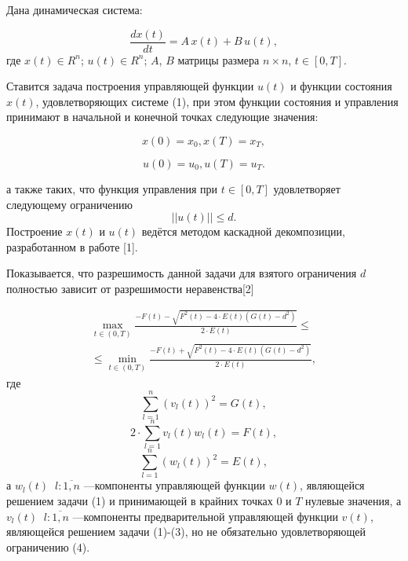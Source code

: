 



Дана  динамическая система:

\begin{equation}
\frac{dx(t)}{dt}=A\, x(t)+B\, u(t),
\end{equation}
где $x(t)\in R^{n}$;
$u(t)\in R^{n}$;
$A$, $B$ матрицы размера $n\times n
$,  $t\in [0,T]$.

Ставится задача построения  управляющей функции $u(t)$ и функции состояния $x(t)$, удовлетворяющих системе (1), при этом  функции состояния и управления  принимают в начальной и конечной точках следующие  значения:

\begin{equation}
x(0)=x_{0},x(T)=x_{T},
\end{equation}

\begin{equation}
u(0)=u_{0},u(T)=u_{T}.
\end{equation}

а также таких, что функция управления при $t\in [0,T]$ удовлетворяет следующему ограничению
\begin{equation}
||u(t)||\leqslant d.
\end{equation}
 Построение $x(t)$ и $u(t)$ ведётся методом каскадной декомпозиции, разработанном в работе [1].

Показывается, что разрешимость данной задачи для взятого ограничения $d$ полностью зависит от разрешимости  неравенства[2]

\begin{multline}
\max\limits_{t\in(0,T)}\frac{-F(t)-\sqrt{F^{2}(t)-4\cdot E(t)(G(t)-d^{2})}}{2\cdot E(t)}
\leqslant
\\ \leqslant
\min\limits_{t\in(0,T)}\frac{-F(t)+\sqrt{F^{2}(t)-4\cdot E(t)(G(t)-d^{2})}}{2\cdot E(t)},
\end{multline}
где $$\sum\limits_{l=1}^{n}(v_{l}(t))^{2}=G(t),$$
$$2\cdot\sum\limits_{l=1}^{n}v_{l}(t)w_{l}(t)=F(t),$$
$$\sum\limits_{l=1}^{n}(w_{l}(t))^{2}=E(t),$$
а $w_{l}(t)\;\;l:\overline{1,n}$ ---компоненты управляющей  функции $w(t)$, являющейся решением задачи (1) и принимающей в крайних точках 0 и $T$ нулевые значения, а $v_{l}(t)\;\;l:\overline{1,n}$ ---компоненты предварительной управляющей  функции $v(t)$, являющейся решением задачи (1)-(3), но не обязательно удовлетворяющей ограничению (4).


